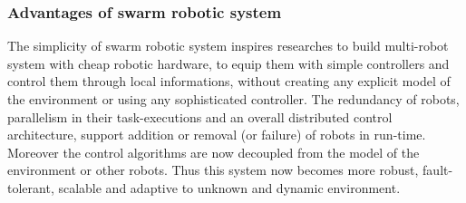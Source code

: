 \subsubsection*{Advantages of swarm robotic system} 
The simplicity of swarm robotic system inspires researches to build multi-robot system with cheap robotic hardware, to equip them with simple controllers and control them through local informations, without creating any explicit model of the environment or using any sophisticated  controller. The redundancy of robots, parallelism in their task-executions and an overall distributed control architecture, support addition or removal (or failure) of robots in run-time. Moreover the control algorithms are now decoupled from the model of the environment or other robots. Thus this system now becomes more robust, fault-tolerant, scalable and adaptive to unknown and dynamic environment.
